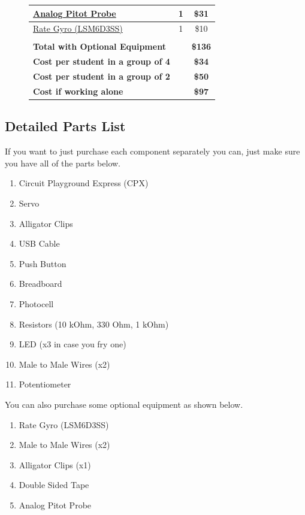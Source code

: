 \begin{figure}[H]
\begin{center}
\begin{tabular}{|l|c|c|}
      \href{https://www.amazon.com/Hobbypower-Airspeed-MPXV7002DP-Differential-controller/dp/B00WSFWO36/ref=sr_1_3?dchild=1&keywords=Airspeed+sensor+kit&qid=1590532161&sr=8-3}{Analog Pitot Probe} & 1 & \$31 \\
      \hline
      \href{https://www.adafruit.com/product/4485}{Rate Gyro (LSM6D3SS)} & 1 & \$10 \\
      \hline
      & & \\
      \hline
      {\bf Total with Optional Equipment} & & {\bf \$136} \\
      \hline
      {\bf Cost per student in a group of 4} & & {\bf \$34} \\
      \hline
      {\bf Cost per student in a group of 2} & & {\bf \$50} \\
      \hline
      {\bf Cost if working alone} & & {\bf \$97} \\
      \hline
    \end{tabular}
  \end{center}
\end{figure}

\subsection{Detailed Parts List}

If you want to just purchase each component separately you can, just
make sure you have all of the parts below.

\begin{enumerate}[itemsep=-5pt]
  \item Circuit Playground Express (CPX)
  \item Servo
  \item Alligator Clips
  \item USB Cable
  \item Push Button
  \item Breadboard
  \item Photocell
  \item Resistors (10 kOhm, 330 Ohm, 1 kOhm)
  \item LED (x3 in case you fry one)
  \item Male to Male Wires (x2)
  \item Potentiometer
\end{enumerate}

You can also purchase some optional equipment as shown below.

\begin{enumerate}[itemsep=-5pt]
\item Rate Gyro (LSM6D3SS)
\item Male to Male Wires (x2)
\item Alligator Clips (x1)
\item Double Sided Tape
\item Analog Pitot Probe
\end{enumerate}
